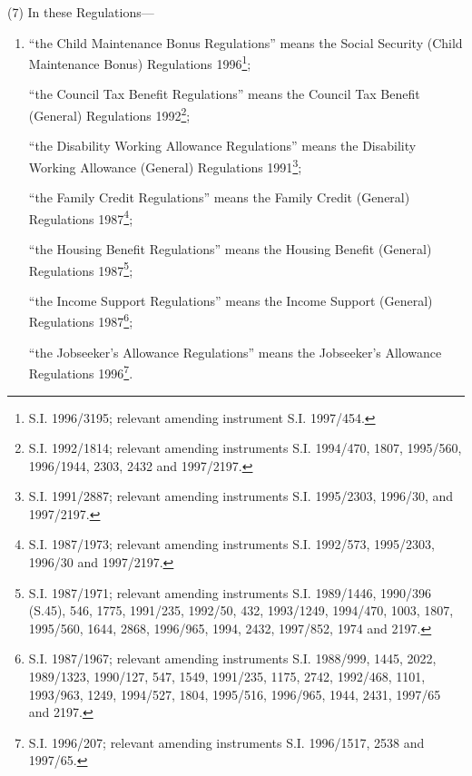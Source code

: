 \documentclass[12pt,a4paper]{article}
\begin{document}
(7) In these Regulations—
\begin{enumerate}\item[]
“the Child Maintenance Bonus Regulations” means the Social Security (Child Maintenance Bonus) Regulations 1996\footnote{\frenchspacing S.I. 1996/3195; relevant amending instrument S.I. 1997/454.};

“the Council Tax Benefit Regulations” means the Council Tax Benefit (General) Regulations 1992\footnote{\frenchspacing S.I. 1992/1814; relevant amending instruments S.I. 1994/470, 1807, 1995/560, 1996/1944, 2303, 2432 and 1997/2197.};

“the Disability Working Allowance Regulations” means the Disability Working Allowance (General) Regulations 1991\footnote{\frenchspacing S.I. 1991/2887; relevant amending instruments S.I. 1995/2303, 1996/30, and 1997/2197.};

“the Family Credit Regulations” means the Family Credit (General) Regulations 1987\footnote{\frenchspacing S.I. 1987/1973; relevant amending instruments S.I. 1992/573, 1995/2303, 1996/30 and 1997/2197.};

“the Housing Benefit Regulations” means the Housing Benefit (General) Regulations 1987\footnote{\frenchspacing S.I. 1987/1971; relevant amending instruments S.I. 1989/1446, 1990/396 (S.45), 546, 1775, 1991/235, 1992/50, 432, 1993/1249, 1994/470, 1003, 1807, 1995/560, 1644, 2868, 1996/965, 1994, 2432, 1997/852, 1974 and 2197.};

“the Income Support Regulations” means the Income Support (General) Regulations 1987\footnote{\frenchspacing S.I. 1987/1967; relevant amending instruments S.I. 1988/999, 1445, 2022, 1989/1323, 1990/127, 547, 1549, 1991/235, 1175, 2742, 1992/468, 1101, 1993/963, 1249, 1994/527, 1804, 1995/516, 1996/965, 1944, 2431, 1997/65 and 2197.};

“the Jobseeker’s Allowance Regulations” means the Jobseeker’s Allowance Regulations 1996\footnote{\frenchspacing S.I. 1996/207; relevant amending instruments S.I. 1996/1517, 2538 and 1997/65.}.
\end{enumerate}

\end{document}
